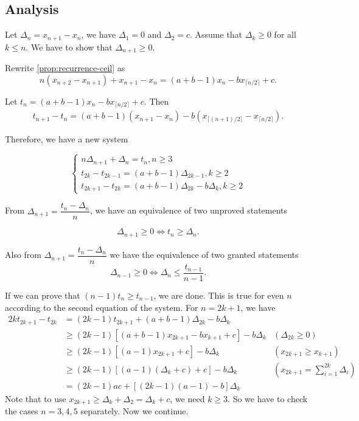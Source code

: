 \subsection{Analysis}

Let $\Delta_n = x_{n+1} - x_n$, we have $\Delta_1=0$ and $\Delta_2 = c$. Assume that $\Delta_k \ge 0$ for all $k \le n$. We have to show that $\Delta_{n+1} \ge 0$.

Rewrite \ref{prop:recurrence-ceil} as
\begin{equation}
  n(x_{n+2} - x_{n+1}) + x_{n+1} - x_n = (a+b-1)x_n - b x_{\lceil n/2\rceil} + c.
\end{equation}

Let $t_n = (a+b-1)x_n - b x_{\lceil n/2\rceil} + c$. Then
\begin{align*}
  t_{n+1} - t_n = (a+b-1)(x_{n+1} - x_n) - b(x_{\lceil (n+1)/2\rceil} - x_{\lceil n/2\rceil}).
\end{align*}

Therefore, we have a new system

$$\begin{cases}
    n\Delta_{n+1} + \Delta_n = t_n, n\ge 3           \\
    t_{2k} - t_{2k-1} = (a+b-1)\Delta_{2k-1}, k\ge 2 \\
    t_{2k+1} - t_{2k} = (a+b-1)\Delta_{2k} - b\Delta_{k}, k\ge 2
  \end{cases}$$

From $\Delta_{n+1} = \dfrac{t_n - \Delta_n}{n}$, we have an equivalence of two unproved statements

$$\Delta_{n+1} \ge 0 \iff t_n \ge \Delta_n.$$


Also from $\Delta_{n+1} = \dfrac{t_n - \Delta_n}{n}$ we have the equivalence of two granted statements
$$\Delta_{n-1} \ge 0 \iff \Delta_{n} \le \dfrac{t_{n-1}}{n-1}.$$

If we can prove that $(n-1)t_n \ge t_{n-1}$, we are done. This is true for even $n$ according to the second equation of the system. For $n=2k+1$, we have
\begin{align*}
  2k t_{2k+1} - t_{2k}
   & = (2k-1)t_{2k+1} + (a+b-1)\Delta_{2k} - b\Delta_{k}                                                         \\
   & \ge (2k-1)[(a+b-1)x_{2k+1} - bx_{k+1} + c] - b\Delta_{k} & (\Delta_{2k} \ge 0)                              \\
   & \ge (2k-1)[(a-1)x_{2k+1} + c] - b\Delta_{k}              & (x_{2k+1} \ge x_{k+1})                           \\
   & \ge (2k-1)[(a-1)(\Delta_k + c)+c] - b\Delta_{k}          & \left(x_{2k+1}=\sum_{i=1}^{2k} \Delta_{i}\right) \\
   & = (2k-1)ac + [(2k-1)(a-1)-b]\Delta_k
\end{align*}
Note that to use $x_{2k+1}\ge \Delta_k + \Delta_2 = \Delta_k + c$, we need $k\ge 3$. So we have to check the cases $n=3,4,5$ separately. Now we continue.

